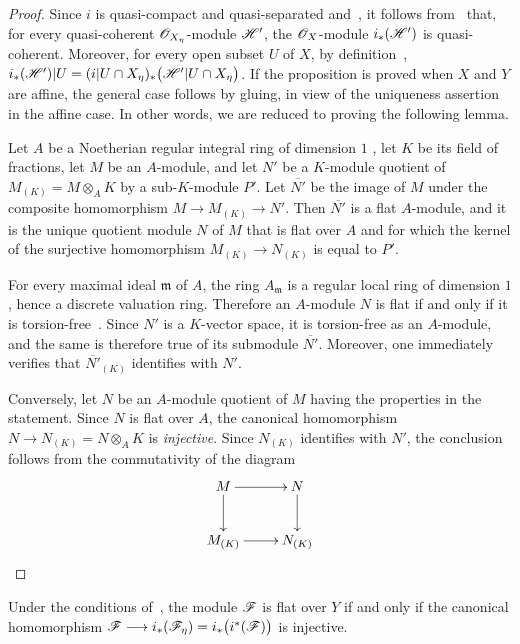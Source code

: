 \begin{proof}
Since $i$ is quasi-compact and quasi-separated
 and~, it follows
from~ that, for every quasi-coherent
$\mathscr{O}_{X_\eta}$-module $\mathscr{H}'$, the $\mathscr{O}_X$-module
$i_*(\mathscr{H}')$ is quasi-coherent. Moreover, for every open subset
$U$ of $X$, by definition~, $i_*(\mathscr{H}')|U
=
(i|U\cap X_\eta)_*
\bigl(\mathscr{H}'|U\cap X_\eta\bigr)$.
If the proposition is proved when $X$ and $Y$ are affine, the general
case follows by gluing, in view of the uniqueness assertion in the
affine case. In other words, we are reduced to proving the following
lemma.

\begin{lemma}[2.8.1.1]
\label{IV.2.8.1.1}
Let $A$ be a Noetherian regular integral ring of dimension $1$
, let $K$ be its field of fractions, let $M$ be an
$A$-module, and let $N'$ be a $K$-module quotient of $M_{(K)}=M\otimes_A K$
by a sub-$K$-module $P'$. Let $\overline{N'}$ be the image of $M$
under the composite homomorphism $M\longrightarrow M_{(K)}\longrightarrow N'$.
Then $\overline{N'}$ is a flat $A$-module, and it is the unique
quotient module $N$ of $M$ that is flat over $A$ and for which the
kernel of the surjective homomorphism $M_{(K)}\longrightarrow N_{(K)}$
is equal to $P'$.
\end{lemma}

For every maximal ideal $\mathfrak{m}$ of $A$, the ring
$A_\mathfrak{m}$ is a regular local ring of dimension $1$, hence a
discrete valuation ring. Therefore an $A$-module $N$ is flat if and
only if it is torsion-free~. Since $N'$ is a
$K$-vector space, it is torsion-free as an $A$-module, and the same is
therefore true of its submodule $\overline{N'}$. Moreover, one
immediately verifies that $\overline{N'}_{(K)}$ identifies with $N'$.

Conversely, let $N$ be an $A$-module quotient of $M$ having the
properties in the statement. Since $N$ is flat over $A$, the
canonical homomorphism $N\longrightarrow N_{(K)}=N\otimes_A K$
is \emph{injective}. Since $N_{(K)}$ identifies with $N'$, the conclusion
follows from the commutativity of the diagram
\[
\xymatrix{
  M \ar[r] \ar[d] & N \ar[d] \\
  M_{(K)} \ar[r] & N_{(K)}
}
\]
\end{proof}

\begin{corollary}[2.8.2]
\label{IV.2.8.2}
Under the conditions of~, the module $\mathscr{F}$ is flat
over $Y$ if and only if the canonical homomorphism $\mathscr{F}\longrightarrow i_*(\mathscr{F}_\eta)
=i_*\bigl(i^*(\mathscr{F})\bigr)$
is injective.
\end{corollary}

